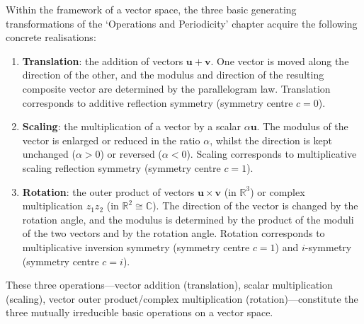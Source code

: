 \begin{definition}\label{def:vector_three_transformations}
Within the framework of a vector space, the three basic generating transformations of the `Operations and Periodicity' chapter acquire the following concrete realisations:
\begin{enumerate}[label=(\roman*)]
    \item \textbf{Translation}: the addition of vectors $\mathbf{u} + \mathbf{v}$. One vector is moved along the direction of the other, and the modulus and direction of the resulting composite vector are determined by the parallelogram law. Translation corresponds to additive reflection symmetry (symmetry centre $c=0$).
    \item \textbf{Scaling}: the multiplication of a vector by a scalar $\alpha \mathbf{u}$. The modulus of the vector is enlarged or reduced in the ratio $\alpha$, whilst the direction is kept unchanged ($\alpha > 0$) or reversed ($\alpha < 0$). Scaling corresponds to multiplicative scaling reflection symmetry (symmetry centre $c = 1$).
    \item \textbf{Rotation}: the outer product of vectors $\mathbf{u} \times \mathbf{v}$ (in $\mathbb{R}^3$) or complex multiplication $z_1 z_2$ (in $\mathbb{R}^2 \cong \mathbb{C}$). The direction of the vector is changed by the rotation angle, and the modulus is determined by the product of the moduli of the two vectors and by the rotation angle. Rotation corresponds to multiplicative inversion symmetry (symmetry centre $c=1$) and $i$-symmetry (symmetry centre $c=i$).
\end{enumerate}
These three operations---vector addition (translation), scalar multiplication (scaling), vector outer product/complex multiplication (rotation)---constitute the three mutually irreducible basic operations on a vector space.
\end{definition}

